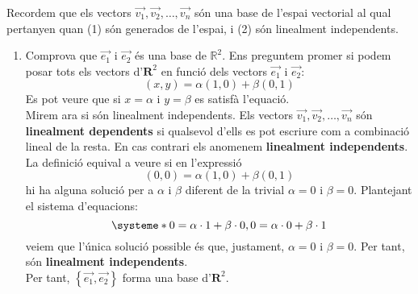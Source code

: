\Answer  Recordem que els vectors $\overrightarrow{v_1},\overrightarrow{v_2}, \ldots, \overrightarrow{v_n}$ són una base de l'espai vectorial al qual pertanyen quan (1) són generados de l'espai, i (2) són linealment independents.
\begin{enumerate}
\item Comprova que $\overrightarrow{e_1}$ i $\overrightarrow{e_2}$ és una base de $\mathbb{R}^2$. Ens preguntem promer si podem posar tots els vectors d'$\mathbf{R}^2$ en funció dels vectors $\overrightarrow{e_1}$ i $\overrightarrow{e_2}$:
\[(x,y) = \alpha (1,0) + \beta (0,1) \]
Es pot veure que si $x=\alpha$ i $y=\beta$ es satisfà l'equació.\\
Mirem ara si són linealment independents. Els vectors $\overrightarrow{v_1},\overrightarrow{v_2}, \ldots, \overrightarrow{v_n}$ són {\bf linealment dependents} si qualsevol d'ells es pot escriure com a combinació lineal de la resta. En cas contrari els anomenem {\bf linealment independents}. La definició equival a veure si en l'expressió
\[(0,0) = \alpha (1,0) + \beta (0,1) \]
hi ha alguna solució per a $\alpha$ i $\beta$ diferent de la trivial $\alpha=0$ i $\beta=0$.
Plantejant el sistema d'equacions:
\[
  \systeme*{0=\alpha\cdot 1 + \beta\cdot 0, 0=\alpha\cdot 0 + \beta\cdot 1}
\]
veiem que l'única solució possible és que, justament, $\alpha=0$ i $\beta=0$. Per tant, són {\bf linealment independents}.\\
Per tant, $\left\{\overrightarrow{e_1},\overrightarrow{e_2}\right\}$ forma una base d'$\mathbf{R}^2$.



\end{enumerate}
